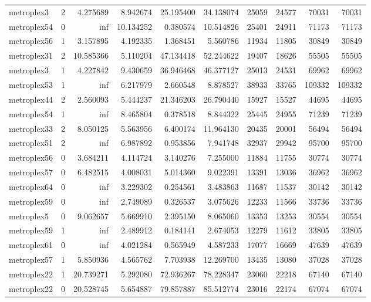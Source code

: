 \begin{longtable}{|l|r|r|r|r|r|r|r|r|r|}
metroplex3 & 2 & 4.275689 & 8.942674 & 25.195400 & 34.138074 & 25059 & 24577 & 70031 & 70031 \\
metroplex54 & 0 & inf & 10.134252 & 0.380574 & 10.514826 & 25401 & 24911 & 71173 & 71173 \\
metroplex56 & 1 & 3.157895 & 4.192335 & 1.368451 & 5.560786 & 11934 & 11805 & 30849 & 30849 \\
metroplex31 & 2 & 10.585366 & 5.110204 & 47.134418 & 52.244622 & 19407 & 18626 & 55505 & 55505 \\
metroplex3 & 1 & 4.227842 & 9.430659 & 36.946468 & 46.377127 & 25013 & 24531 & 69962 & 69962 \\
metroplex53 & 1 & inf & 6.217979 & 2.660548 & 8.878527 & 38933 & 33765 & 109332 & 109332 \\
metroplex44 & 2 & 2.560093 & 5.444237 & 21.346203 & 26.790440 & 15927 & 15527 & 44695 & 44695 \\
metroplex54 & 1 & inf & 8.465804 & 0.378518 & 8.844322 & 25445 & 24955 & 71239 & 71239 \\
metroplex33 & 2 & 8.050125 & 5.563956 & 6.400174 & 11.964130 & 20435 & 20001 & 56494 & 56494 \\
metroplex51 & 2 & inf & 6.987892 & 0.953856 & 7.941748 & 32937 & 29942 & 95700 & 95700 \\
metroplex56 & 0 & 3.684211 & 4.114724 & 3.140276 & 7.255000 & 11884 & 11755 & 30774 & 30774 \\
metroplex57 & 0 & 6.482515 & 4.008031 & 5.014360 & 9.022391 & 13391 & 13036 & 36962 & 36962 \\
metroplex64 & 0 & inf & 3.229302 & 0.254561 & 3.483863 & 11687 & 11537 & 30142 & 30142 \\
metroplex59 & 0 & inf & 2.749089 & 0.326537 & 3.075626 & 12233 & 11566 & 33736 & 33736 \\
metroplex5 & 0 & 9.062657 & 5.669910 & 2.395150 & 8.065060 & 13353 & 13253 & 30554 & 30554 \\
metroplex59 & 1 & inf & 2.489912 & 0.184141 & 2.674053 & 12279 & 11612 & 33805 & 33805 \\
metroplex61 & 0 & inf & 4.021284 & 0.565949 & 4.587233 & 17077 & 16669 & 47639 & 47639 \\
metroplex57 & 1 & 5.850936 & 4.565762 & 7.703938 & 12.269700 & 13435 & 13080 & 37028 & 37028 \\
metroplex22 & 1 & 20.739271 & 5.292080 & 72.936267 & 78.228347 & 23060 & 22218 & 67140 & 67140 \\
metroplex22 & 0 & 20.528745 & 5.654887 & 79.857887 & 85.512774 & 23016 & 22174 & 67074 & 67074 \\

\end{longtable}
